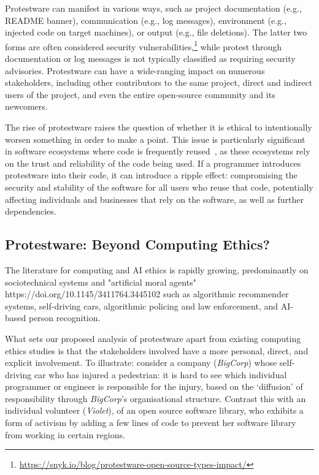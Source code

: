 \documentclass[journal,twocolumn]{IEEEtran}
\begin{document}
Protestware can manifest in various ways, such as project documentation (e.g., README banner), communication (e.g., log messages), environment (e.g., injected code on target machines), or output (e.g., file deletions). The latter two forms are often considered security vulnerabilities,\footnote{\url{https://snyk.io/blog/protestware-open-source-types-impact/}} while protest through documentation or log messages is not typically classified as requiring security advisories. Protestware can have a wide-ranging impact on numerous stakeholders, including other contributors to the same project, direct and indirect users of the project, and even the entire open-source community and its newcomers.

The rise of protestware raises the question of whether it is ethical to intentionally worsen something in order to make a point. This issue is particularly significant in software ecosystems where code is frequently reused~\cite{zahan2022weak}, as these ecosystems rely on the trust and reliability of the code being used. If a programmer introduces protestware into their code, it can introduce a ripple effect: compromising the security and stability of the software for all users who reuse that code, potentially affecting individuals and businesses that rely on the software, as well as further dependencies.





\subsection{Protestware: Beyond Computing Ethics?}
The literature for computing and AI ethics is rapidly growing, predominantly on sociotechnical systems and "artificial moral agents" https://doi.org/10.1145/3411764.3445102 such as algorithmic recommender systems, self-driving cars, algorithmic policing and law enforcement, and AI-based person recognition.

What sets our proposed analysis of protestware apart from existing computing ethics studies is that the stakeholders involved have a more personal, direct, and explicit involvement. To illustrate: consider a company (\textit{BigCorp}) whose self-driving car who has injured a pedestrian: it is hard to see which individual programmer or engineer is responsible for the injury, based on the `diffusion' of responsibility through \textit{BigCorp}'s organisational structure. Contrast this with an individual volunteer (\textit{Violet}), of an open source software library, who exhibits a form of activism by adding a few lines of code to prevent her software library from working in certain regions. 
\end{document}
